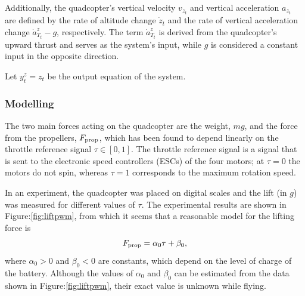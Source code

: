 \documentclass{report}
\begin{document}
Additionally, the quadcopter's vertical velocity \( v_{z_t} \) and vertical
acceleration \( a_{z_t} \) are defined by the rate of altitude change \(
\dot{z}_t \) and the rate of vertical acceleration change \( \dot{a}^z_{T_t} - g
\), respectively. The term \( \dot{a}^z_{T_t} \) is derived from the
quadcopter's upward thrust and serves as the system's input, while \( g \) is
considered a constant input in the opposite direction.

Let \( y_{t}^z = z_t \) be the output equation of the system. 

\subsubsection*{Modelling}
  The two main forces acting on the quadcopter are the weight, $mg$, and the
  force from the propellers, $F_{\rm prop}$, which has been found to depend
  linearly on the throttle reference signal $\tau\in[0,1]$. The throttle
  reference signal is a signal that is sent to the electronic speed controllers
  (ESCs) of the four motors; at $\tau=0$ the motors do not spin, whereas
  $\tau=1$ corresponds to the maximum rotation speed.
  
  In an experiment, the quadcopter was placed on digital scales and the lift (in
  $\unit{g}$) was measured for different values of $\tau$. The experimental
  results are shown in Figure:\ref{fig:liftpwm}, from which it seems that a
  reasonable model for the lifting force is
  \begin{equation}
    F_{\rm prop} = \alpha_0 \tau + \beta_0,
    \label{eq:Fprop}
  \end{equation}
  where $\alpha_0>0$ and $\beta_0<0$ are constants, which depend on the level of
  charge of the battery. Although the values of $\alpha_0$ and $\beta_0$ can be
  estimated from the data shown in Figure:\ref{fig:liftpwm}, their exact value
  is unknown while flying.
  
\end{document}

